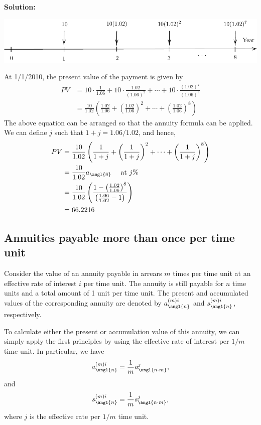 \documentclass[landscape, 20pt]{extreport}
\theoremstyle{definition}
\theoremstyle{definition}
\theoremstyle{definition}
\theoremstyle{definition}
\theoremstyle{remark}
\begin{document}
\textbf{Solution:}

\begin{center}\includegraphics{tikz-ex20-1} \end{center}

At 1/1/2010, the present value of the payment is given by
\[\begin{aligned}
    PV &= 10 \cdot \frac{1}{1.06} + 10 \cdot \frac{1.02}{(1.06)^2} + \cdots +  10 \cdot \frac{(1.02)^7}{(1.06)^8} \\
        &= \frac{10}{1.02} \left(  \frac{1.02}{1.06} +  \left(  \frac{1.02}{1.06}  \right)^2 + \cdots +
    \left(  \frac{1.02}{1.06}  \right)^8  \right)\end{aligned}\] The
above equation can be arranged so that the annuity formula can be
applied. We can define \(j\) such that \(1 + j = 1.06/1.02\), and hence,
\[\begin{aligned}
    PV &= \frac{10}{1.02} \left(  \frac{1}{1 + j} +  \left(  \frac{1}{1+j}  \right)^2 + \cdots +
    \left(  \frac{1}{1+j}  \right)^8  \right)  \\
    &=   \frac{10}{1.02}  a_\angl{8} \quad  \text{ at } j\% \\
    &=  \frac{10}{1.02} \left(   \frac{1 - \left(\frac{1.02}{1.06}\right)^8   }{\left(   \frac{1.06}{1.02}   - 1 \right)}  \right) \\
    &= 66.2216\end{aligned}\]

\newpage \hypertarget{annuities-payable-more-than-once-per-time-unit}{%
\subsection{Annuities payable more than once per time unit}\label{annuities-payable-more-than-once-per-time-unit}}

Consider the value of an annuity payable in arrears \(m\) times per time
unit at an effective rate of interest \(i\) per time unit. The annuity is
still payable for \(n\) time units and a total amount of 1 unit per time
unit. The present and accumulated values of the corresponding annuity
are denoted by \(a^{(m)i}_\angl{n}\) and \(s^{(m)i}_\angl{n}\),
respectively.

To calculate either the present or accumulation value of this annuity,
we can simply apply the first principles by using the effective rate of
interest per \(1/m\) time unit. In particular, we have
\[a^{(m)i}_\angl{n}   = \frac{1}{m}  a^j_\angl{n\cdot m},\] and
\[s^{(m)i}_\angl{n}   = \frac{1}{m}  s^j_\angl{n\cdot m},\] where \(j\) is
the effective rate per \(1/m\) time unit.
\end{document}
